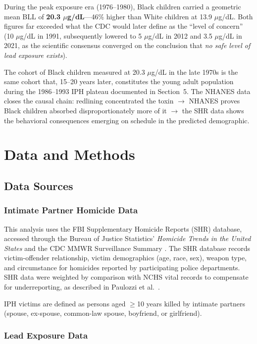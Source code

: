 \documentclass[12pt, letterpaper]{article}
\begin{document}
During the peak exposure era (1976--1980), Black children carried a geometric mean BLL of \textbf{20.3 $\mu$g/dL}---46\% higher than White children at 13.9 $\mu$g/dL. Both figures far exceeded what the CDC would later define as the ``level of concern'' (10 $\mu$g/dL in 1991, subsequently lowered to 5 $\mu$g/dL in 2012 and 3.5 $\mu$g/dL in 2021, as the scientific consensus converged on the conclusion that \textit{no safe level of lead exposure exists}).

The cohort of Black children measured at 20.3 $\mu$g/dL in the late 1970s is the same cohort that, 15--20 years later, constitutes the young adult population during the 1986--1993 IPH plateau documented in Section~5. The NHANES data closes the causal chain: redlining concentrated the toxin $\rightarrow$ NHANES proves Black children absorbed disproportionately more of it $\rightarrow$ the SHR data shows the behavioral consequences emerging on schedule in the predicted demographic.

\section{Data and Methods}

\subsection{Data Sources}

\subsubsection{Intimate Partner Homicide Data}

This analysis uses the FBI Supplementary Homicide Reports (SHR) database, accessed through the Bureau of Justice Statistics' \textit{Homicide Trends in the United States} \citep{fox2007} and the CDC MMWR Surveillance Summary \citep{paulozzi2001}. The SHR database records victim-offender relationship, victim demographics (age, race, sex), weapon type, and circumstance for homicides reported by participating police departments. SHR data were weighted by comparison with NCHS vital records to compensate for underreporting, as described in Paulozzi et al.\ \citeyearpar{paulozzi2001}.

IPH victims are defined as persons aged $\geq$10 years killed by intimate partners (spouse, ex-spouse, common-law spouse, boyfriend, or girlfriend).

\subsubsection{Lead Exposure Data}
\end{document}
